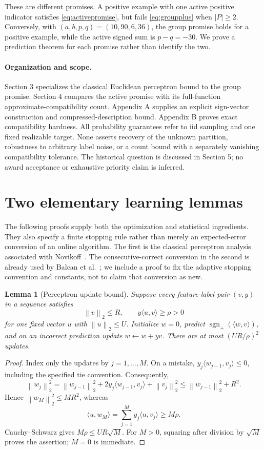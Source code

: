\documentclass[11pt,a4paper]{article}
\newtheorem{lemma}[theorem]{Lemma}
\theoremstyle{remark}
\newcommand{\sgnplus}{\operatorname{sgn}_{+}}
\newcommand{\norm}[1]{\left\lVert#1\right\rVert}
\newcommand{\ip}[2]{\langle #1,#2\rangle}
\newcommand{\1}{\mathbf 1}
\begin{document}
These are different promises. A positive example with one active positive
indicator satisfies \eqref{eq:activepromise}, but fails
\eqref{eq:groupplus} when $|P|\ge2$. Conversely, with
$(a,b,p,q)=(10,90,6,36)$, the group promise holds for a positive example, while
the active signed sum is $p-q=-30$. We prove a prediction theorem for each
promise rather than identify the two.

\paragraph{Organization and scope.}
Section 3 specializes the classical Euclidean perceptron bound to the group
promise. Section 4 compares the active promise with its full-function
approximate-compatibility count. Appendix A supplies an explicit sign-vector
construction and compressed-description bound. Appendix B proves exact
compatibility hardness. All probability guarantees refer to iid sampling and
one fixed realizable target. None asserts recovery of the unknown partition,
robustness to arbitrary label noise, or a count bound with a separately
vanishing compatibility tolerance. The historical question is discussed in
Section 5; no award acceptance or exhaustive priority claim is inferred.

\section{Two elementary learning lemmas}

The following proofs supply both the optimization and statistical ingredients.
They also specify a finite stopping rule rather than merely an expected-error
conversion of an online algorithm.
The first is the classical perceptron analysis associated with
Novikoff~\cite{novikoff1962}. The consecutive-correct conversion in the second
is already used by Balcan et al.~\cite[Section 3.2]{bbel2013}; we include a
proof to fix the adaptive stopping convention and constants, not to claim
that conversion as new.

\begin{lemma}[Perceptron update bound]\label{lem:perceptron}
Suppose every feature-label pair $(v,y)$ in a sequence satisfies
\[
 \norm{v}_2\le R,\qquad y\ip{u}{v}\ge\rho>0
\]
for one fixed vector $u$ with $\norm{u}_2\le U$. Initialize $w=0$, predict
$\sgnplus(\ip{w}{v})$, and on an incorrect prediction update $w\leftarrow w+yv$.
There are at most $(UR/\rho)^2$ updates.
\end{lemma}
\begin{proof}
Index only the updates by $j=1,\ldots,M$. On a mistake,
$y_j\ip{w_{j-1}}{v_j}\le0$, including the specified tie convention. Consequently,
\[
 \norm{w_j}_2^2
 =\norm{w_{j-1}}_2^2+2y_j\ip{w_{j-1}}{v_j}+\norm{v_j}_2^2
 \le\norm{w_{j-1}}_2^2+R^2.
\]
Hence $\norm{w_M}_2^2\le MR^2$, whereas
\[
 \ip{u}{w_M}=\sum_{j=1}^M y_j\ip{u}{v_j}\ge M\rho.
\]
Cauchy--Schwarz gives $M\rho\le UR\sqrt M$. For $M>0$, squaring after division
by $\sqrt M$ proves the assertion; $M=0$ is immediate.
\end{proof}
\end{document}
